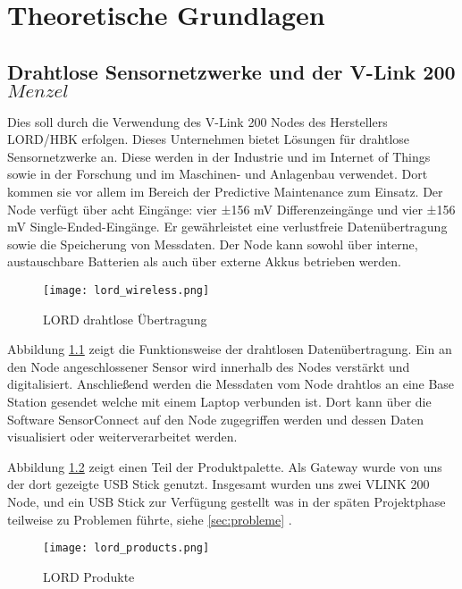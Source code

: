 \chapter{Theoretische Grundlagen}


\section{Drahtlose Sensornetzwerke und der V-Link 200 \(Menzel\)}

Dies soll durch die Verwendung des V-Link 200 Nodes des Herstellers LORD/HBK erfolgen.
Dieses Unternehmen bietet Lösungen für drahtlose Sensornetzwerke an. Diese werden in der
Industrie und im Internet of Things sowie in der Forschung und im Maschinen- und Anlagenbau verwendet. Dort kommen sie vor allem im Bereich der Predictive Maintenance zum Einsatz.
Der Node verfügt über acht Eingänge: vier ±156 mV Differenzeingänge und vier ±156 mV Single-Ended-Eingänge. Er gewährleistet eine verlustfreie Datenübertragung sowie die Speicherung von Messdaten. Der Node kann sowohl über interne, austauschbare Batterien als auch über externe Akkus betrieben werden.

\begin{figure}[h]
    \begin{center}
        \texttt{[image: lord\_wireless.png]}
        \caption[LORD drahtlose Übertragung (Abbildungsverzeichnis)]{LORD drahtlose Übertragung
        \cite{VLInkManual}
        }
        \label{fig:lordwireless}
    \end{center}
\end{figure}

Abbildung \ref{fig:lordwireless} zeigt die Funktionsweise der drahtlosen Datenübertragung.
Ein an den Node angeschlossener Sensor wird innerhalb des Nodes verstärkt und digitalisiert.
Anschließend werden die Messdaten vom Node drahtlos an eine Base Station gesendet welche mit einem Laptop verbunden ist.
Dort kann über die Software SensorConnect auf den Node zugegriffen werden und dessen Daten visualisiert oder weiterverarbeitet werden.


Abbildung \ref{fig:lordproducts} zeigt einen Teil der Produktpalette.
Als Gateway wurde von uns der dort gezeigte USB Stick genutzt.
Insgesamt wurden uns zwei VLINK 200 Node, und ein USB Stick zur Verfügung gestellt was in der späten Projektphase teilweise zu Problemen führte,
siehe \ref{sec:probleme} .

\begin{figure}[h]
    \begin{center}
        \texttt{[image: lord\_products.png]}
        \caption[LORD Produkte (Abbildungsverzeichnis)]{LORD Produkte
        \cite{VLInkManual}
        }
        \label{fig:lordproducts}
    \end{center}
\end{figure}


